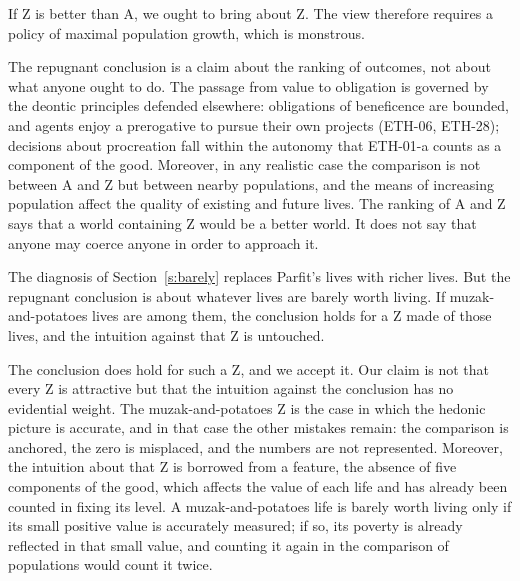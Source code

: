 \documentclass{situationist-preprint}
\begin{document}
\begin{objection}
If Z is better than A, we ought to bring about Z. The view therefore requires a policy of maximal population growth, which is monstrous.
\end{objection}

\begin{reply}
The repugnant conclusion is a claim about the ranking of outcomes, not about what anyone ought to do. The passage from value to obligation is governed by the deontic principles defended elsewhere: obligations of beneficence are bounded, and agents enjoy a prerogative to pursue their own projects (ETH-06, ETH-28); decisions about procreation fall within the autonomy that ETH-01-a counts as a component of the good. Moreover, in any realistic case the comparison is not between A and Z but between nearby populations, and the means of increasing population affect the quality of existing and future lives. The ranking of A and Z says that a world containing Z would be a better world. It does not say that anyone may coerce anyone in order to approach it.
\end{reply}

\begin{objection}
The diagnosis of Section~\ref{s:barely} replaces Parfit's lives with richer lives. But the repugnant conclusion is about whatever lives are barely worth living. If muzak-and-potatoes lives are among them, the conclusion holds for a Z made of those lives, and the intuition against that Z is untouched.
\end{objection}

\begin{reply}
The conclusion does hold for such a Z, and we accept it. Our claim is not that every Z is attractive but that the intuition against the conclusion has no evidential weight. The muzak-and-potatoes Z is the case in which the hedonic picture is accurate, and in that case the other mistakes remain: the comparison is anchored, the zero is misplaced, and the numbers are not represented. Moreover, the intuition about that Z is borrowed from a feature, the absence of five components of the good, which affects the value of each life and has already been counted in fixing its level. A muzak-and-potatoes life is barely worth living only if its small positive value is accurately measured; if so, its poverty is already reflected in that small value, and counting it again in the comparison of populations would count it twice.
\end{reply}
\end{document}
